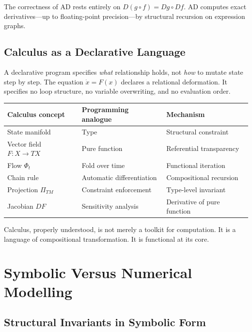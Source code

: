 \documentclass[12pt,openany]{book}
\newcommand{\proj}[1]{\Pi_{#1}}
\begin{document}
The correctness of AD rests entirely on $D(g\circ f)=Dg\circ Df$. AD computes
exact derivatives—up to floating-point precision—by structural recursion on
expression graphs.

\section{Calculus as a Declarative Language}

A declarative program specifies \emph{what} relationship holds, not \emph{how}
to mutate state step by step. The equation $\dot x = F(x)$ declares a
relational deformation. It specifies no loop structure, no variable overwriting,
and no evaluation order.

\begin{center}
\begin{tabular}{@{}lll@{}}
  \toprule
  \textbf{Calculus concept} & \textbf{Programming analogue} & \textbf{Mechanism} \\
  \midrule
  State manifold & Type & Structural constraint \\
  Vector field $F:X\to TX$ & Pure function & Referential transparency \\
  Flow $\Phi_t$ & Fold over time & Functional iteration \\
  Chain rule & Automatic differentiation & Compositional recursion \\
  Projection $\proj{TM}$ & Constraint enforcement & Type-level invariant \\
  Jacobian $DF$ & Sensitivity analysis & Derivative of pure function \\
  \bottomrule
\end{tabular}
\end{center}

\begin{insight}
  Calculus, properly understood, is not merely a toolkit for computation. It is
  a language of compositional transformation. It is functional at its core.
\end{insight}

\chapter{Symbolic Versus Numerical Modelling}
\label{ch:symnum}

\section{Structural Invariants in Symbolic Form}
\end{document}
